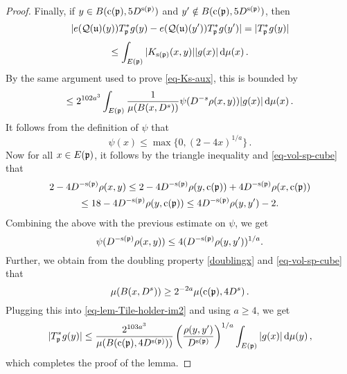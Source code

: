{\begin{proof}
        Finally, if $y \in B({\mathrm{c}}({\mathfrak p}), 5D^{{\mathrm{s}}({\mathfrak p})})$ and $y' \notin B({\mathrm{c}}({\mathfrak p}), 5D^{{\mathrm{s}}({\mathfrak p})})$, then
        $$
            |e({\mathcal{Q}}({\mathfrak u})(y)) T_{{\mathfrak p}}^* g(y) - e({\mathcal{Q}}({\mathfrak u})(y')) T_{{\mathfrak p}}^* g(y')| = |T_{{\mathfrak p}}^* g(y)|
        $$
        $$
            \le \int_{E({\mathfrak p})} |K_{{\mathrm{s}}({\mathfrak p})}(x,y)| |g(x)| \, \mathrm{d}\mu(x)\,.
        $$
        By the same argument used to prove \eqref{eq-Ks-aux}, this is bounded by
        \begin{equation}
            \label{eq-lem-Tile-holder-im2}
            \le 2^{102a^3} \int_{E({\mathfrak p})} \frac{1}{\mu(B(x, D^s))} \psi(D^{-s} \rho(x,y)) |g(x)| \, \mathrm{d}\mu(x)\,.
        \end{equation}
        It follows from the definition of $\psi$ that
        $$
            \psi(x) \le \max\{0, (2  - 4x)^{1/a}\}\,.
        $$
        Now for all $x\in E({\mathfrak p})$, it follows by the triangle inequality and \eqref{eq-vol-sp-cube} that
        \begin{multline*}
        2  - 4D^{-{\mathrm{s}}({\mathfrak p})}\rho(x,y)\leq 2  - 4D^{-{\mathrm{s}}({\mathfrak p})}\rho(y, {\mathrm{c}}({\mathfrak p})) + 4 D^{-{\mathrm{s}}({\mathfrak p})}\rho(x, {\mathrm{c}}({\mathfrak p}))\\\leq 18 - 4 D^{-{\mathrm{s}}({\mathfrak p})} \rho(y, {\mathrm{c}}({\mathfrak p})) \leq 4 D^{-{\mathrm{s}}({\mathfrak p})}\rho(y,y') - 2 .
        \end{multline*}
        Combining the above with the previous estimate on $\psi$, we get
        $$
            \psi(D^{-{\mathrm{s}}({\mathfrak p})}\rho(x,y))  \le 4 (D^{-{\mathrm{s}}({\mathfrak p})}\rho(y,y'))^{1/a}.
        $$
        Further, we obtain from the doubling property \eqref{doublingx} and \eqref{eq-vol-sp-cube} that
        $$
            \mu(B(x, D^s)) \ge 2^{-2a} \mu({\mathrm{c}}({\mathfrak p}), 4D^s)\,.
        $$
        Plugging this into \eqref{eq-lem-Tile-holder-im2} and using $a \ge 4$, we get
        $$
            |T_{{\mathfrak p}}^* g(y)| \le   \frac{2^{103a^3}}{\mu(B({\mathrm{c}}({\mathfrak p}), 4D^{{\mathrm{s}}({\mathfrak p})}))} \left(\frac{\rho(y,y')}{D^{{\mathrm{s}}({\mathfrak p})}}\right)^{1/a} \int_{E({\mathfrak p})} |g(x)| \, \mathrm{d}\mu(y)\,,
        $$
        which completes the proof of the lemma.
    \end{proof}

}
